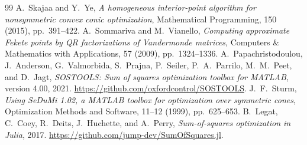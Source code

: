 \documentclass[11pt,a4paper]{article}
\begin{document}
\begin{thebibliography}{99}
 A.~Skajaa and Y.~Ye, \emph{A homogeneous interior-point algorithm for nonsymmetric convex conic optimization}, Mathematical Programming, 150 (2015), pp.~391--422.
 A.~Sommariva and M.~Vianello, \emph{Computing approximate Fekete points by QR factorizations of Vandermonde matrices}, Computers \& Mathematics with Applications, 57 (2009), pp.~1324--1336.
 A.~Papachristodoulou, J.~Anderson, G.~Valmorbida, S.~Prajna, P.~Seiler, P.~A.~Parrilo, M.~M.~Peet, and D.~Jagt, \emph{SOSTOOLS: Sum of squares optimization toolbox for MATLAB}, version 4.00, 2021. \url{https://github.com/oxfordcontrol/SOSTOOLS}.
 J.~F.~Sturm, \emph{Using SeDuMi 1.02, a MATLAB toolbox for optimization over symmetric cones}, Optimization Methods and Software, 11--12 (1999), pp.~625--653.
 B.~Legat, C.~Coey, R.~Deits, J.~Huchette, and A.~Perry, \emph{Sum-of-squares optimization in Julia}, 2017. \url{https://github.com/jump-dev/SumOfSquares.jl}.
\end{thebibliography}
\end{document}
